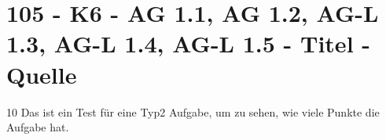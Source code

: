 \section{105 - K6 - AG 1.1, AG 1.2, AG-L 1.3, AG-L 1.4, AG-L 1.5 - Titel - Quelle}

\begin{langesbeispiel}\item[10] %
Das ist ein Test für eine Typ2 Aufgabe, um zu sehen, wie viele Punkte die Aufgabe hat.

\end{langesbeispiel}